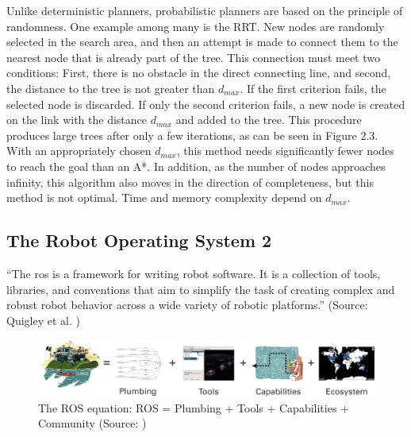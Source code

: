 Unlike deterministic planners, probabilistic planners are based on the principle of randomness. One example among many is the RRT. New nodes are randomly selected in the search area, and then an attempt is made to connect them to the nearest node that is already part of the tree. This connection must meet two conditions: First, there is no obstacle in the direct connecting line, and second, the distance to the tree is not greater than \(d_{max}\). If the first criterion fails, the selected node is discarded. If only the second criterion fails, a new node is created on the link with the distance \(d_{max}\) and added to the tree. This procedure produces large trees after only a few iterations, as can be seen in Figure 2.3. With an appropriately chosen \(d_{max}\), this method needs significantly fewer nodes to reach the goal than an A*. In addition, as the number of nodes approaches infinity, this algorithm also moves in the direction of completeness, but this method is not optimal. Time and memory complexity depend on \(d_{max}\).


\subsection{The Robot Operating System 2}
\begin{displayquote}
    \enquote{The \acrfull{ros} is a framework for writing robot software. It is a collection of tools, libraries, and conventions that aim to simplify the task of creating
    complex and robust robot behavior across a wide variety of robotic platforms.} (Source: Quigley et al. \cite{quigley_programming_2015})
\end{displayquote}
    
\begin{figure}[h]
    \centering
    \includegraphics[width=1\textwidth]{figures/20_state_of_the_art/ros_equation.png}
    \caption[The ROS equation]{The ROS equation: ROS = Plumbing + Tools + Capabilities + Community (Source: \cite{open_robotics_ros_2020})}
    \label{fig:ros_equation}
\end{figure}

